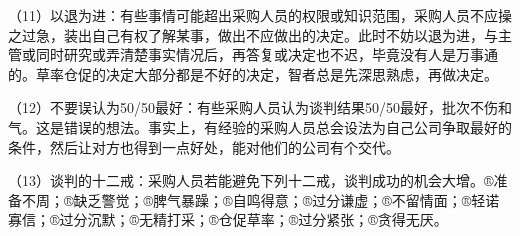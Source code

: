     （11）以退为进：有些事情可能超出采购人员的权限或知识范围，采购人员不应操之过急，装出自己有权了解某事，做出不应做出的决定。此时不妨以退为进，与主管或同时研究或弄清楚事实情况后，再答复或决定也不迟，毕竟没有人是万事通的。草率仓促的决定大部分都是不好的决定，智者总是先深思熟虑，再做决定。

    （12）不要误认为50/50最好：有些采购人员认为谈判结果50/50最好，批次不伤和气。这是错误的想法。事实上，有经验的采购人员总会设法为自己公司争取最好的条件，然后让对方也得到一点好处，能对他们的公司有个交代。

    （13）谈判的十二戒：采购人员若能避免下列十二戒，谈判成功的机会大增。®准备不周；®缺乏警觉；®脾气暴躁；®自鸣得意；®过分谦虚；®不留情面；®轻诺寡信；®过分沉默；®无精打采；®仓促草率；®过分紧张；®贪得无厌。
